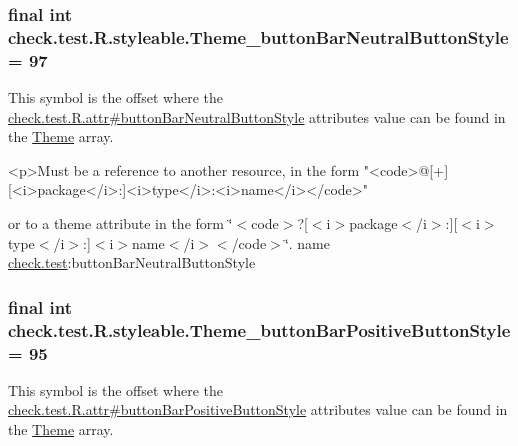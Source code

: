 \subsubsection[{Theme\+\_\+button\+Bar\+Neutral\+Button\+Style}]{\setlength{\rightskip}{0pt plus 5cm}final int check.\+test.\+R.\+styleable.\+Theme\+\_\+button\+Bar\+Neutral\+Button\+Style = 97\hspace{0.3cm}{\ttfamily [static]}}\label{classcheck_1_1test_1_1_r_1_1styleable_a18a041fde9f2407a8e18b1c7a357e426}
This symbol is the offset where the \hyperlink{classcheck_1_1test_1_1_r_1_1attr_a2dcc478f258562aa2b0462e764f8706c}{check.\+test.\+R.\+attr\#button\+Bar\+Neutral\+Button\+Style} attribute\textquotesingle{}s value can be found in the \hyperlink{classcheck_1_1test_1_1_r_1_1styleable_acca726d02016a0cf607782ec3a436a81}{Theme} array.

\begin{DoxyVerb}      <p>Must be a reference to another resource, in the form "<code>@[+][<i>package</i>:]<i>type</i>:<i>name</i></code>"
\end{DoxyVerb}
 or to a theme attribute in the form \char`\"{}$<$code$>$?\mbox{[}$<$i$>$package$<$/i$>$\+:\mbox{]}\mbox{[}$<$i$>$type$<$/i$>$\+:\mbox{]}$<$i$>$name$<$/i$>$$<$/code$>$\char`\"{}.  name \hyperlink{namespacecheck_1_1test}{check.\+test}\+:button\+Bar\+Neutral\+Button\+Style \hypertarget{classcheck_1_1test_1_1_r_1_1styleable_ac2ac7678c2fe6e4ec90fbff60457ded3}{}
\subsubsection[{Theme\+\_\+button\+Bar\+Positive\+Button\+Style}]{\setlength{\rightskip}{0pt plus 5cm}final int check.\+test.\+R.\+styleable.\+Theme\+\_\+button\+Bar\+Positive\+Button\+Style = 95\hspace{0.3cm}{\ttfamily [static]}}\label{classcheck_1_1test_1_1_r_1_1styleable_ac2ac7678c2fe6e4ec90fbff60457ded3}
This symbol is the offset where the \hyperlink{classcheck_1_1test_1_1_r_1_1attr_a9c25c7766ad861d2e9abc49971df83c5}{check.\+test.\+R.\+attr\#button\+Bar\+Positive\+Button\+Style} attribute\textquotesingle{}s value can be found in the \hyperlink{classcheck_1_1test_1_1_r_1_1styleable_acca726d02016a0cf607782ec3a436a81}{Theme} array.

